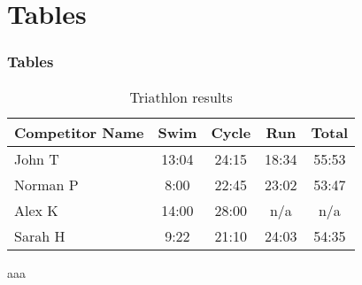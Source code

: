 \section{Tables}
\label{tables}
\begin{frame}\frametitle{Tables}
  \begin{table}
    \begin{tabular}{l | c | c | c | c }
      Competitor Name & Swim & Cycle & Run & Total \\
      \hline \hline
      John T & 13:04 & 24:15 & 18:34 & 55:53 \\ 
      Norman P & 8:00 & 22:45 & 23:02 & 53:47\\
      Alex K & 14:00 & 28:00 & n/a & n/a\\
      Sarah H & 9:22 & 21:10 & 24:03 & 54:35 
    \end{tabular}
    \caption{Triathlon results}
  \end{table}
  aaa\cite{zhongbao2003reply}
\end{frame}